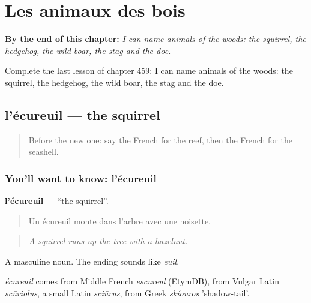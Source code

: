 
\chapter{Les animaux des bois}
\label{ch:fr-les-animaux-des-bois}

\begin{chapteropening}
\textbf{By the end of this chapter:} \emph{I can name animals of the woods: the squirrel, the hedgehog, the wild boar, the stag and the doe.}

Complete the last lesson of chapter 459: I can name animals of the woods: the squirrel, the hedgehog, the wild boar, the stag and the doe.
\end{chapteropening}

\section[l'écureuil]{l'écureuil — the squirrel}

\label{lesson:FR-C459-ecureuil}



\begin{quote}
Before the new one: say the French for the reef, then the French for the seashell.
\end{quote}

\subsection*{You'll want to know: l'écureuil}
\textbf{l'écureuil} — \textquotedblleft{}the squirrel\textquotedblright{}.

\begin{quote}
Un écureuil monte dans l'arbre avec une noisette.
\end{quote}

\begin{quote}
\emph{A squirrel runs up the tree with a hazelnut.}
\end{quote}

A masculine noun. The ending sounds like \emph{euil}.

\begin{cousinweb}
\emph{écureuil} comes from Middle French \emph{escureul} (EtymDB), from Vulgar Latin \emph{scūriolus}, a small Latin \emph{sciūrus}, from Greek \emph{skíouros} 'shadow-tail'.
\end{cousinweb}

